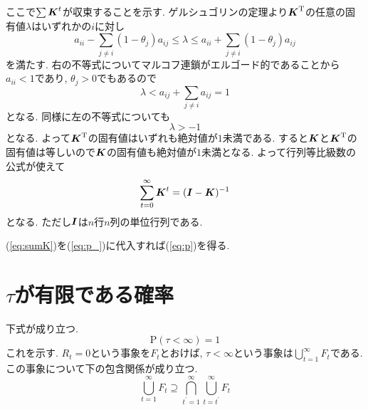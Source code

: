 ここで$ \sum \boldsymbol{K}^t $が収束することを示す. 
ゲルシュゴリンの定理\cite{s_saito}より$ \boldsymbol{K}^{\mathrm{T}} $の任意の固有値$ \lambda $はいずれかの$ i $に対し
\begin{equation}
    a_{i i} - \sum_{j \ne i}(1 - \theta_j) a_{i j} \le \lambda \le a_{i i} + \sum_{j \ne i}(1 - \theta_j) a_{i j}
\end{equation}
を満たす. 右の不等式についてマルコフ連鎖がエルゴード的であることから$ a_{i i} < 1 $であり, \cite{funaki}$ \theta_j > 0 $でもあるので
\begin{equation}
    \lambda < a_{i j} + \sum_{j \ne i} a_{i j} = 1
\end{equation}
となる. 同様に左の不等式についても
\begin{equation}
    \lambda > -1
\end{equation}
となる. よって$ \boldsymbol{K}^\mathrm{T} $の固有値はいずれも絶対値が$ 1 $未満である. すると$ \boldsymbol{K} $と$ \boldsymbol{K}^{\mathrm{T}} $の固有値は等しいので$ \boldsymbol{K} $の固有値も絶対値が$ 1 $未満となる. 
よって行列等比級数の公式が使えて\cite{m_saito}
\begin{equation} \label{eq:sumK}
    \sum_{t=0}^{\infty} \boldsymbol{K}^t = (\boldsymbol{I} - \boldsymbol{K})^{-1}
\end{equation}
となる. ただし$ \boldsymbol{I} $は$ n $行$ n $列の単位行列である. 

(\ref{eq:sumK})を(\ref{eq:p_})に代入すれば(\ref{eq:p})を得る. 

\section{$ \tau $が有限である確率}
下式が成り立つ. 
\begin{equation}
    \mathrm{P}(\tau < \infty) = 1
\end{equation}
これを示す. $ R_t = 0 $という事象を$ F_t $とおけば, $ \tau < \infty $という事象は$ \bigcup_{t=1}^{\infty} F_t $である. 
この事象について下の包含関係が成り立つ. 
\begin{equation} \label{eq:UFt}
    \bigcup_{t=1}^{\infty} F_t \supseteq \bigcap_{t^{\prime}=1}^{\infty} \bigcup_{t=t^{\prime}}^{\infty} F_t
\end{equation}

